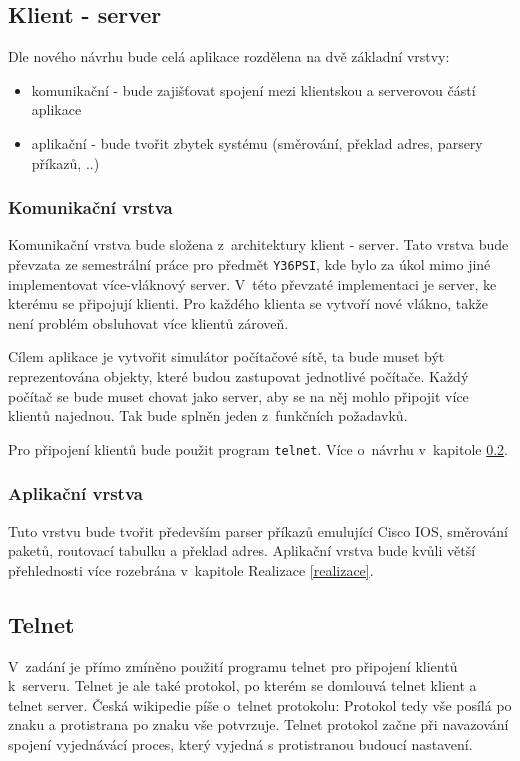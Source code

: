 
\subsection{Klient - server}\label{klient_server}
Dle nového návrhu bude celá aplikace rozdělena na dvě základní vrstvy:
\begin{itemize}
 \item komunikační - bude zajišťovat spojení mezi klientskou a serverovou částí aplikace
 \item aplikační - bude tvořit zbytek systému (směrování, překlad adres, parsery příkazů, ..)
\end{itemize}

\subsubsection{Komunikační vrstva}
Komunikační vrstva bude složena z~architektury klient - server. Tato vrstva bude převzata ze semestrální práce pro předmět \verb|Y36PSI|, kde bylo za úkol mimo jiné implementovat více-vláknový server. V~této převzaté implementaci je server, ke kterému se připojují klienti. Pro každého klienta se vytvoří nové vlákno, takže není problém obsluhovat více klientů zároveň. 

Cílem aplikace je vytvořit simulátor počítačové sítě, ta bude muset být reprezentována objekty, které budou zastupovat jednotlivé počítače. Každý počítač se bude muset chovat jako server, aby se na něj mohlo připojit více klientů najednou. Tak bude splněn jeden z~funkčních požadavků.

Pro připojení klientů bude použit program \verb|telnet|. Více o~návrhu v~kapitole \ref{telnet}. 


\subsubsection{Aplikační vrstva}
Tuto vrstvu bude tvořit především parser příkazů emulující Cisco IOS, směrování paketů, routovací tabulku a překlad adres. Aplikační vrstva bude kvůli větší přehlednosti více rozebrána v~kapitole Realizace \ref{realizace}.


\subsection{Telnet} \label{telnet}
V~zadání je přímo zmíněno použití programu telnet pro připojení klientů k~serveru. Telnet je ale také protokol, po kterém se domlouvá telnet klient a telnet server. Česká wikipedie píše o~telnet protokolu: \cite{wiki:telnet} Protokol tedy vše posílá po znaku a protistrana po znaku vše potvrzuje. Telnet protokol začne při navazování spojení vyjednávácí proces, který vyjedná s protistranou budoucí nastavení.

